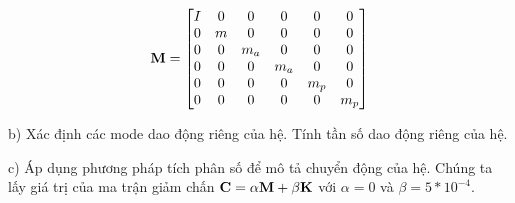 \begin{equation}
    {\bf M} =\begin{bmatrix}
        I & 0 & 0 & 0 & 0 & 0 \\
        0 & m & 0 & 0 & 0 & 0 \\
        0 & 0 & m_a & 0 & 0 & 0 \\
        0 & 0 & 0 & m_a & 0 & 0 \\
        0 & 0 & 0 & 0 & m_p & 0 \\
        0 & 0 & 0 & 0 & 0 & m_p
    \end{bmatrix}
\end{equation}

b) Xác định các mode dao động riêng của hệ. Tính tần số dao động riêng của hệ.

c) Áp dụng phương pháp tích phân số để mô tả chuyển động của hệ. Chúng ta lấy giá trị của ma trận giảm chấn ${\bf C} = \alpha{\bf M} + \beta{\bf K}$ với $\alpha = 0$ và $\beta = 5*10^{-4}$.